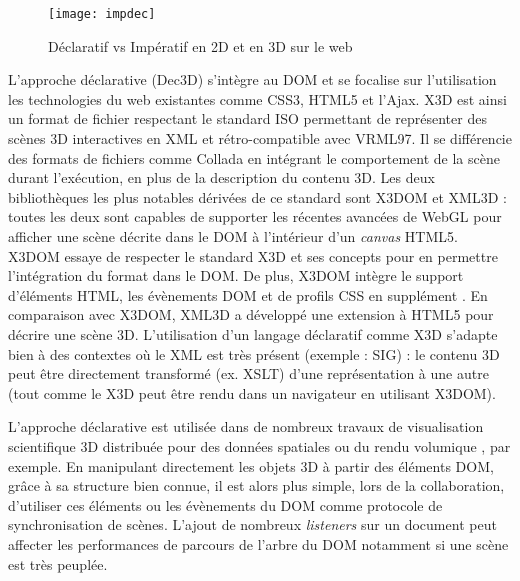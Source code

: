 \begin{figure}[hbt]
	\centering
	\texttt{[image: impdec]}
	\caption{Déclaratif vs Impératif en 2D et en 3D sur le web}
	\label{fig:impdec}
\end{figure}

L'approche déclarative (Dec3D) s'intègre au \gls{DOM} et se 
focalise sur l'utilisation les technologies du web existantes comme CSS3, 
HTML5 et l'Ajax. 
X3D est ainsi un format de fichier respectant le standard ISO \cite{X3D2011} permettant de 
représenter des scènes 3D interactives en XML et rétro-compatible avec VRML97. Il 
se différencie des formats de fichiers comme Collada en intégrant le comportement de 
la scène durant l'exécution, en plus de la description du contenu 3D. Les deux 
bibliothèques les plus notables dérivées de ce standard sont X3DOM 
\cite{Behr2010} et XML3D \cite{Sons2010} : toutes les deux sont capables de 
supporter les récentes avancées de WebGL pour afficher une scène décrite dans 
le \gls{DOM} à l'intérieur d'un \textit{canvas} HTML5. 
X3DOM essaye de respecter le standard X3D et ses concepts pour en permettre 
l'intégration du format dans le \gls{DOM}. De plus, X3DOM intègre le support 
d'éléments \gls{HTML}, les évènements \gls{DOM} et de profils \acrshort{CSS} en 
supplément \cite{Sutter2015}. 
En comparaison avec X3DOM, XML3D a développé une extension à \gls{HTML}5 
pour décrire une scène 3D. 
L'utilisation d'un langage déclaratif comme X3D s'adapte bien à des contextes où le XML est très présent (exemple : \gls{SIG}) : le contenu 3D peut être directement transformé (ex. XSLT) d'une 
représentation à une autre (tout comme le X3D peut être rendu dans un navigateur 
en utilisant X3DOM). 

L'approche déclarative est utilisée dans de nombreux travaux de visualisation 
scientifique 3D distribuée \cite{Jung2012} pour des données spatiales 
\cite{Stein2014} ou du rendu volumique \cite{Becher2012}, par exemple. 
En manipulant directement les objets 3D à partir des éléments \gls{DOM}, grâce à 
sa structure bien connue, il est alors plus simple, lors de la collaboration, d'utiliser 
ces éléments \cite{Gadea2016} ou les évènements du \gls{DOM} \cite{Lowet2009} 
comme protocole de synchronisation de scènes. 
L'ajout de nombreux \textit{listeners} sur un document peut affecter les 
performances de parcours de l'arbre du \gls{DOM} notamment si une scène est
très peuplée.

